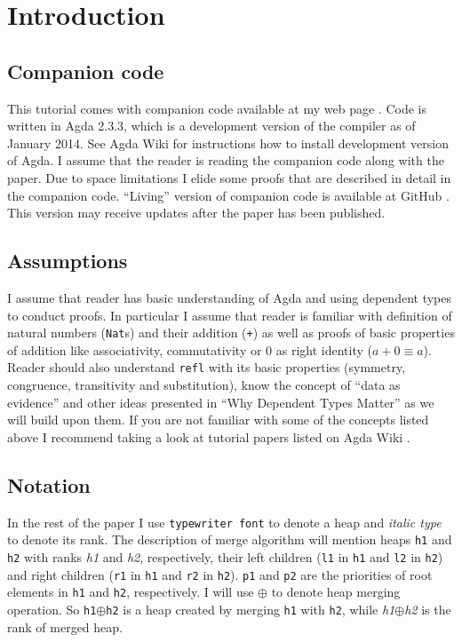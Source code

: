 \section{Introduction}

\subsection{Companion code}

This tutorial comes with companion code available at my web page \cite{js-webhome}. Code is written in Agda 2.3.3, which is a development version of the compiler as of January 2014. See Agda Wiki \cite{agda-wiki} for instructions how to install development version of Agda. I assume that the reader is reading the companion code along with the paper. Due to space limitations I elide some proofs that are described in detail in the companion code. ``Living'' version of companion code is available at GitHub \cite{js-github}. This version may receive updates after the paper has been published.

\subsection{Assumptions}

I assume that reader has basic understanding of Agda and using dependent types to conduct proofs. In particular I assume that reader is familiar with definition of natural numbers (\texttt{Nat}s) and their addition (\texttt{+}) as well as proofs of basic properties of addition like associativity, commutativity or 0 as right identity ($a + 0 ≡ a$). Reader should also understand \texttt{refl} with its basic properties (symmetry, congruence, transitivity and substitution), know the concept of ``data as evidence'' and other ideas presented in ``Why Dependent Types Matter'' \cite{AltMcBMcK05} as we will build upon them. If you are not familiar with some of the concepts listed above I recommend taking a look at tutorial papers listed on Agda Wiki \cite{agda-wiki}.

\subsection{Notation}

In the rest of the paper I use \texttt{typewriter font} to denote a heap and \textit{italic type} to denote its rank. The description of merge algorithm will mention heaps \texttt{h1} and \texttt{h2} with ranks \textit{h1} and \textit{h2}, respectively, their left children (\texttt{l1} in \texttt{h1} and \texttt{l2} in \texttt{h2}) and right children (\texttt{r1} in \texttt{h1} and \texttt{r2} in \texttt{h2}). \texttt{p1} and \texttt{p2} are the priorities of root elements in \texttt{h1} and \texttt{h2}, respectively. I will use $\oplus$ to denote heap merging operation. So \texttt{h1}$\oplus$\texttt{h2} is a heap created by merging \texttt{h1} with \texttt{h2}, while \textit{h1}$\oplus$\textit{h2} is the rank of merged heap.

